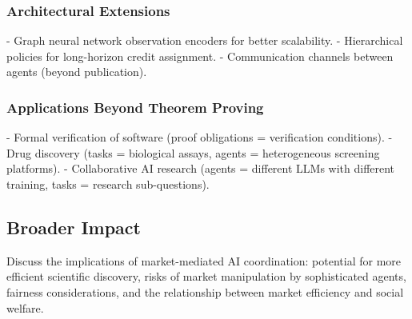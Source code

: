 \subsubsection{Architectural Extensions}
- Graph neural network observation encoders for better scalability.
- Hierarchical policies for long-horizon credit assignment.
- Communication channels between agents (beyond publication).

\subsubsection{Applications Beyond Theorem Proving}
- Formal verification of software (proof obligations = verification conditions).
- Drug discovery (tasks = biological assays, agents = heterogeneous screening platforms).
- Collaborative AI research (agents = different LLMs with different training, tasks = research sub-questions).

\subsection{Broader Impact}
Discuss the implications of market-mediated AI coordination: potential for more efficient scientific discovery, risks of market manipulation by sophisticated agents, fairness considerations, and the relationship between market efficiency and social welfare.
